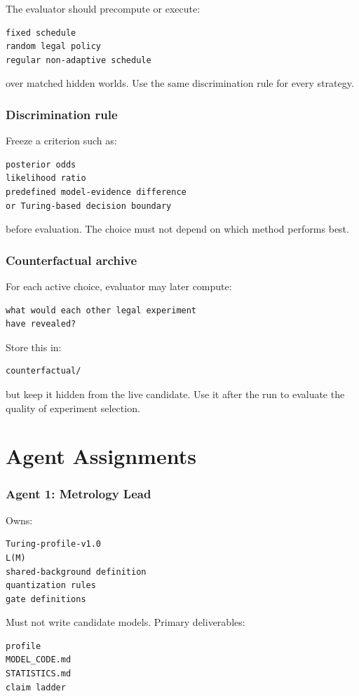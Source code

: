 \documentclass[11pt]{article}
\begin{document}
The evaluator should precompute or execute:
\begin{verbatim}
fixed schedule
random legal policy
regular non-adaptive schedule
\end{verbatim}
over matched hidden worlds. Use the same discrimination rule for every strategy.

\section{Discrimination rule}

Freeze a criterion such as:
\begin{verbatim}
posterior odds
likelihood ratio
predefined model-evidence difference
or Turing-based decision boundary
\end{verbatim}
before evaluation. The choice must not depend on which method performs best.

\section{Counterfactual archive}

For each active choice, evaluator may later compute:
\begin{verbatim}
what would each other legal experiment
have revealed?
\end{verbatim}
Store this in:
\begin{verbatim}
counterfactual/
\end{verbatim}
but keep it hidden from the live candidate. Use it after the run to evaluate the quality of experiment selection.

\part{Agent Assignments}

\section{Agent 1: Metrology Lead}

Owns:
\begin{verbatim}
Turing-profile-v1.0
L(M)
shared-background definition
quantization rules
gate definitions
\end{verbatim}
Must not write candidate models. Primary deliverables:
\begin{verbatim}
profile
MODEL_CODE.md
STATISTICS.md
claim ladder
\end{verbatim}
\end{document}
